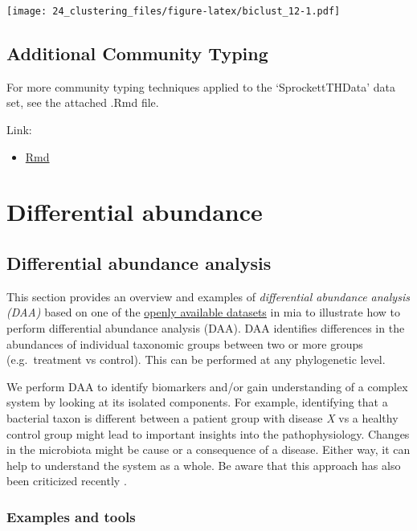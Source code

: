 \documentclass[
]{book}
\providecommand{\tightlist}{%
  \setlength{\itemsep}{0pt}\setlength{\parskip}{0pt}}
\begin{document}
\texttt{[image: 24\_clustering\_files/figure-latex/biclust\_12-1.pdf]}

\hypertarget{additional-community-typing}{%
\section{Additional Community Typing}\label{additional-community-typing}}

For more community typing techniques applied to the `SprockettTHData' data set, see the attached .Rmd file.

Link:

\begin{itemize}
\tightlist
\item
  \href{add-comm-typing.Rmd}{Rmd}
\end{itemize}

\hypertarget{differential-abundance}{%
\chapter{Differential abundance}\label{differential-abundance}}

\hypertarget{differential-abundance-analysis}{%
\section{Differential abundance analysis}\label{differential-abundance-analysis}}

This section provides an overview and examples of \emph{differential
abundance analysis (DAA)} based on one of the \href{https://microbiome.github.io/mia/reference/mia-datasets.html}{openly available
datasets}
in mia to illustrate how to perform differential abundance analysis
(DAA). DAA identifies differences in the abundances of individual
taxonomic groups between two or more groups (e.g.~treatment vs
control). This can be performed at any phylogenetic level.

We perform DAA to identify biomarkers and/or gain understanding of a
complex system by looking at its isolated components. For example,
identifying that a bacterial taxon is different between a patient
group with disease \emph{X} vs a healthy control group might lead to
important insights into the pathophysiology. Changes in the microbiota
might be cause or a consequence of a disease. Either way, it can
help to understand the system as a whole. Be aware that this approach
has also been criticized recently \citep{Quinn2021}.

\hypertarget{examples-and-tools}{%
\subsection{Examples and tools}\label{examples-and-tools}}
\end{document}
